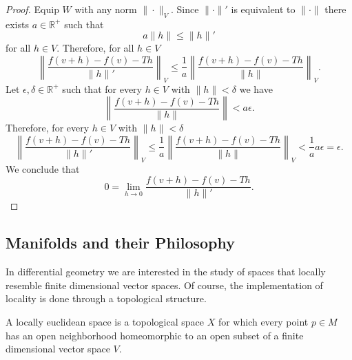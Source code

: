 \begin{proof}
Equip $W$ with any norm $\|\cdot\|_V$. Since $\|\cdot\|'$ is equivalent to $\|\cdot\|$ there exists $a\in\mathbb{R}^+$ such that
\begin{equation}
	a\|h\|\leq\|h\|'
\end{equation}
for all $h\in V$. Therefore, for all $h\in V$
\begin{equation}
	\left\lVert\frac{f(v+h)-f(v)-Th}{\|h\|'}\right\rVert_V\leq\frac{1}{a}\left\lVert\frac{f(v+h)-f(v)-Th}{\|h\|}\right\rVert_V.
\end{equation}
Let $\epsilon,\delta\in\mathbb{R}^+$ such that for every $h\in V$ with $\|h\|<\delta$ we have
\begin{equation}
	\left\lVert\frac{f(v+h)-f(v)-Th}{\|h\|}\right\rVert<a\epsilon.
\end{equation}
Therefore, for every $h\in V$ with $\|h\|<\delta$
\begin{equation}
	\left\lVert\frac{f(v+h)-f(v)-Th}{\|h\|'}\right\rVert_V\leq\frac{1}{a}\left\lVert\frac{f(v+h)-f(v)-Th}{\|h\|}\right\rVert_V<\frac{1}{a}a\epsilon=\epsilon.
\end{equation}
We conclude that 
\begin{equation}
	0=\lim_{h\rightarrow 0}\frac{f(v+h)-f(v)-Th}{\|h\|'}.
\end{equation}
\end{proof}

\subsection{Manifolds and their Philosophy}

In differential geometry we are interested in the study of spaces that locally resemble finite dimensional vector spaces. Of course, the implementation of locality is done through a topological structure. 

\begin{definition}

	A locally euclidean space is a topological space $X$ for which every point $p\in M$ has an open neighborhood homeomorphic to an open subset of a finite dimensional vector space $V$.

\end{definition}



 